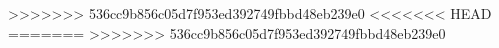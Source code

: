 >>>>>>> 536cc9b856c05d7f953ed392749fbbd48eb239e0
%
<<<<<<< HEAD
=======
>>>>>>> 536cc9b856c05d7f953ed392749fbbd48eb239e0
%
